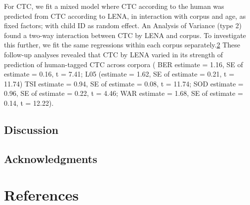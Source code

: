 \documentclass[english,floatsintext,man]{apa6}
\begin{document}
For CTC, we fit a mixed model where CTC according to the human was
predicted from CTC according to LENA, in interaction with corpus and
age, as fixed factors; with child ID as random effect. An Analysis of
Variance (type 2) found a two-way interaction between CTC by LENA and
corpus. To investigate this further, we fit the same regressions within
each corpus
separately.\href{For\%20both\%20TSI\%20and\%20WAR,\%20the\%20variance\%20associated\%20to\%20the\%20child\%20ID\%20random\%20factor\%20was\%20zero.\%20This\%20suggests\%20a\%20mixed\%20model\%20was\%20not\%20necessary,\%20as\%20child\%20ID\%20is\%20not\%20explaining\%20any\%20additional\%20variance,\%20but\%20it\%20does\%20not\%20alter\%20the\%20interpretation\%20in\%20the\%20main\%20text.}{2}
These follow-up analyses revealed that CTC by LENA varied in its
strength of prediction of human-tagged CTC across corpora ( BER estimate
= 1.16, SE of estimate = 0.16, t = 7.41; L05 (estimate = 1.62, SE of
estimate = 0.21, t = 11.74) TSI estimate = 0.94, SE of estimate = 0.08,
t = 11.74; SOD estimate = 0.96, SE of estimate = 0.22, t = 4.46; WAR
estimate = 1.68, SE of estimate = 0.14, t = 12.22).

\subsection{Discussion}\label{discussion}

\subsection{Acknowledgments}\label{acknowledgments}

\newpage

\section{References}\label{references}

\setlength{\parindent}{-0.5in} \setlength{\leftskip}{0.5in}
\end{document}
